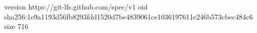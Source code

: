 version https://git-lfs.github.com/spec/v1
oid sha256:1e9a1193d56fb8293fdd1520d7be4839061ce1036197611e246b573cbec484c6
size 716
